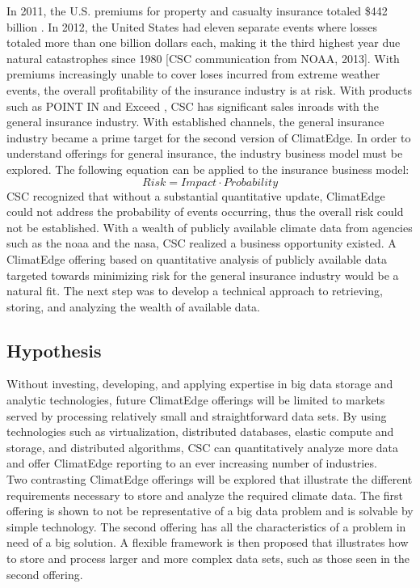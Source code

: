 In 2011, the U.S. premiums for property and casualty insurance totaled \$442 billion \cite{iii}. In 2012, the United States had eleven separate events where losses totaled more than one billion dollars each, making it the third highest year due natural catastrophes since 1980  [\textsc{CSC} communication from NOAA, 2013]. With premiums  increasingly unable to cover loses incurred from extreme weather events, the overall profitability of the insurance industry is at risk. With products such as POINT IN \cite{point_in} and Exceed \cite{exceed}, \textsc{CSC} has significant sales inroads with the general insurance industry. With established channels, the general insurance industry became a prime target for the second version of ClimatEdge\texttrademark{}. In order to understand offerings for general insurance, the industry business model must be explored. The following equation can be applied to the insurance  business model: 
\begin{equation*}
    Risk = Impact \cdot Probability
\end{equation*}
\textsc{CSC} recognized that without a substantial quantitative update, ClimatEdge\texttrademark{} could not address the probability of events occurring, thus the overall risk could not be established. With a wealth of publicly available climate data from agencies such as the \gls{noaa} and the \gls{nasa}, \textsc{CSC} realized a business opportunity existed. A ClimatEdge\texttrademark{} offering based on quantitative analysis of publicly available data targeted towards minimizing risk for the general insurance industry would be a natural fit. The next step was to develop a technical approach to retrieving, storing, and analyzing the wealth of available data. 
\subsection{Hypothesis}
Without investing, developing, and applying expertise in big data  storage and analytic technologies, future ClimatEdge\texttrademark{} offerings will be limited to markets served by processing relatively small and straightforward data sets. By using technologies such as virtualization, distributed databases, elastic compute and storage, and distributed algorithms, \textsc{CSC} can quantitatively analyze more data and offer ClimatEdge\texttrademark{} reporting to an ever increasing number of industries.\\

Two contrasting ClimatEdge\texttrademark{} offerings will be explored that illustrate the different requirements necessary to store and analyze the required climate data. The first offering is shown to not be representative of a big data problem and is solvable by simple technology. The second offering has all the characteristics of a problem in need of a big solution. A flexible framework is then proposed that illustrates how to store and process larger and more complex data sets, such as those seen in the second offering.
